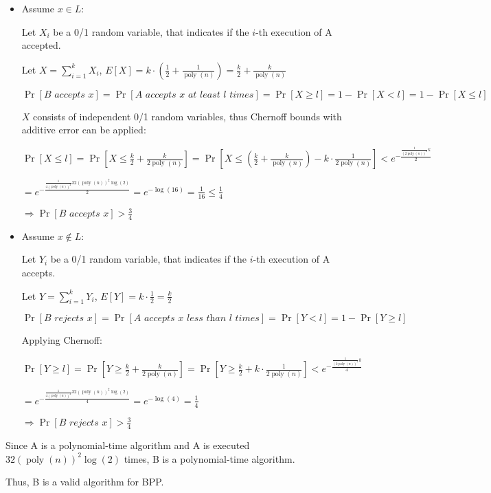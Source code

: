 \begin{itemize}
    \item Assume $x \in L$:

Let $X_i$ be a 0/1 random variable, that indicates if the $i$-th execution of A accepted.

Let $X = \sum\limits_{i=1}^k X_i$,
$E[X] = k \cdot \left( \frac{1}{2} + \frac{1}{\operatorname{poly}(n)} \right) = \frac{k}{2} + \frac{k}{\operatorname{poly}(n)}$

$\operatorname{Pr}[\textit{B accepts } x] 
= \operatorname{Pr}[\textit{A accepts } x \textit{ at least l times}]
= \operatorname{Pr}[X \geq l] 
= 1 - \operatorname{Pr}[X < l]
= 1 - \operatorname{Pr}[X \leq l]$

$X$ consists of independent 0/1 random variables, thus Chernoff bounds with additive error can be applied:

$\operatorname{Pr}[X \leq l]= \operatorname{Pr}\left[X \leq  \frac{k}{2} + \frac{k}{2 \operatorname{poly}(n)}\right]
= \operatorname{Pr}\left[X \leq  \left(\frac{k}{2} + \frac{k}{\operatorname{poly}(n)}\right) - k\cdot\frac{1}{2\operatorname{poly}(n)}\right]
< e^{-\frac{\frac{1}{(2\operatorname{poly}(n))^2} k}{2}}
$

$=
e^{-\frac{\frac{1}{4 (\operatorname{poly}(n))^2} 32(\operatorname{poly}(n))^2\operatorname{log}(2)}{2}} 
=
e^{-\operatorname{log}(16)}
= \frac{1}{16} \leq \frac{1}{4}$

$\Rightarrow
\operatorname{Pr}[\textit{B accepts } x] > \frac{3}{4}$ 

\item Assume $x \notin L$:

Let $Y_i$ be a 0/1 random variable, that indicates if the $i$-th execution of A accepts.

Let $Y = \sum\limits_{i=1}^k Y_i$,
$E[Y] = k \cdot\frac{1}{2} = \frac{k}{2}$

$\operatorname{Pr}[\textit{B rejects } x] 
= \operatorname{Pr}[\textit{A accepts } x \textit{ less than l times}]
= \operatorname{Pr}[Y < l] 
= 1 - \operatorname{Pr}[Y \geq l]$

Applying Chernoff:

$\operatorname{Pr}[Y \geq l]
= \operatorname{Pr}\left[Y \geq \frac{k}{2} + \frac{k}{2 \operatorname{poly}(n)}\right]
= \operatorname{Pr}\left[Y \geq \frac{k}{2} + k\cdot\frac{1}{2\operatorname{poly}(n)}\right]
< e^{-\frac{\frac{1}{(2\operatorname{poly}(n))^2} k}{4}}$

$=
e^{-\frac{\frac{1}{4(\operatorname{poly}(n))^2} 32(\operatorname{poly}(n))^2\operatorname{log}(2)}{4}} 
=
e^{-\operatorname{log}(4)}
= \frac{1}{4}$

$\Rightarrow
\operatorname{Pr}[\textit{B rejects } x] > \frac{3}{4}$ 

\end{itemize}

Since A is a polynomial-time algorithm and A is executed $32(\operatorname{poly}(n))^2\operatorname{log}(2)$ times, B is a polynomial-time algorithm.

Thus, B is a valid algorithm for BPP.

\pagebreak

